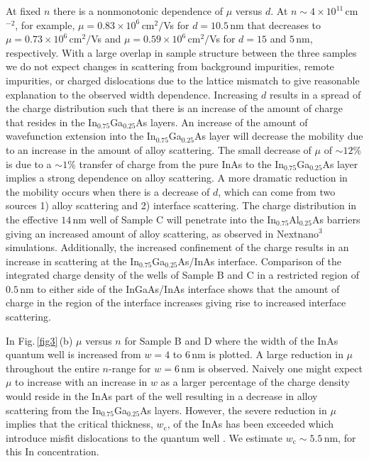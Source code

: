 \documentclass[
floatfix,
aps,
prl,
twocolumn,
superscriptaddress,
amssymb,
 groupaddress,
]{revtex4}
\begin{document}
At fixed $n$ there is a nonmonotonic dependence of $\mu$ versus $d$.
At $n\sim 4 \times 10^{11}\,$cm$^{-2}$, for example, $\mu= 0.83 \times 10^{6}\,$cm$^{2}/$Vs for $d=10.5\,$nm that decreases to $\mu=0.73 \times 10^{6}\,$cm$^{2}/$Vs and $\mu=0.59 \times 10^{6}\,$cm$^{2}/$Vs for $d=15$ and $5\,$nm, respectively.
With a large overlap in sample structure between the three samples we do not expect changes in scattering from background impurities, remote impurities, or charged dislocations due to the lattice mismatch to give reasonable explanation to the observed width dependence.
Increasing $d$ results in a spread of the charge distribution such that there is an increase of the amount of charge that resides in the In$_{0.75}$Ga$_{0.25}$As layers.
An increase of the amount of wavefunction extension into the In$_{0.75}$Ga$_{0.25}$As layer will decrease the mobility due to an increase in the amount of alloy scattering.
The small decrease of $\mu$ of $\sim 12\%$ is due to a $\sim 1\%$ transfer of charge from the pure InAs to the In$_{0.75}$Ga$_{0.25}$As layer implies a strong dependence on alloy scattering.
A more dramatic reduction in the mobility occurs when there is a decrease of $d$, which can come from two sources 1) alloy scattering and 2) interface scattering.
The charge distribution in the effective $14\,$nm well of Sample C will penetrate into the In$_{0.75}$Al$_{0.25}$As barriers giving an increased amount of alloy scattering, as observed in Nextnano$^{3}$ simulations.
Additionally, the increased confinement of the charge results in an increase in scattering at the In$_{0.75}$Ga$_{0.25}$As/InAs interface.
Comparison of the integrated charge density of the wells of Sample B and C in a restricted region of $0.5\,$nm to either side of the InGaAs/InAs interface shows that the amount of charge in the region of the interface increases giving rise to increased interface scattering.


In Fig.\,\ref{fig3}\,(b) $\mu$ versus $n$ for Sample B and D where the width of the InAs quantum well is increased from $w=4$ to $6\,$nm is plotted.
A large reduction in $\mu$ throughout the entire $n$-range for $w=6\,$nm is observed.
Naively one might expect $\mu$ to increase with an increase in $w$ as a larger percentage of the charge density would reside in the InAs part of the well resulting in a decrease in alloy scattering from the In$_{0.75}$Ga$_{0.25}$As layers.
However, the severe reduction in $\mu$ implies that the critical thickness, $w_{\mathrm{c}}$, of the InAs has been exceeded which introduce misfit dislocations to the quantum well \citep{capotondi:2005,shabani:2014}.
We estimate $w_{\mathrm{c}}\sim 5.5\,$nm, for this In concentration.
\end{document}
